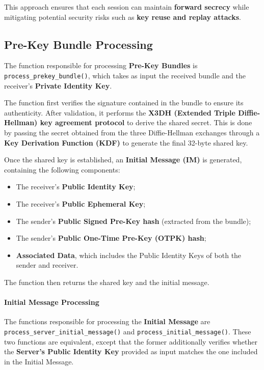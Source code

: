 \noindent This approach ensures that each session can maintain \textbf{forward secrecy} while mitigating potential security risks such as \textbf{key reuse and replay attacks}.

\subsection{Pre-Key Bundle Processing}
\label{subsec:Pre-KeyBundleProcessing}

The function responsible for processing \textbf{Pre-Key Bundles} is \texttt{process\_prekey\_bundle()}, which takes as input the received bundle and the receiver's \textbf{Private Identity Key}.

\noindent The function first verifies the signature contained in the bundle to ensure its authenticity. After validation, it performs the \textbf{X3DH (Extended Triple Diffie-Hellman) key agreement protocol} to derive the shared secret. This is done by passing the secret obtained from the three Diffie-Hellman exchanges through a \textbf{Key Derivation Function (KDF)} to generate the final 32-byte shared key.  

\noindent Once the shared key is established, an \textbf{Initial Message (IM)} is generated, containing the following components:  

\begin{itemize}  
    \item The receiver's \textbf{Public Identity Key};  
    \item The receiver's \textbf{Public Ephemeral Key};  
    \item The sender's \textbf{Public Signed Pre-Key hash} (extracted from the bundle);  
    \item The sender's \textbf{Public One-Time Pre-Key (OTPK) hash};  
    \item \textbf{Associated Data}, which includes the Public Identity Keys of both the sender and receiver.  
\end{itemize}  

\noindent The function then returns the shared key and the initial message.

\paragraph{Initial Message Processing}  
\sloppy  
The functions responsible for processing the \textbf{Initial Message} are \texttt{process\_server\_initial\_message()} and \texttt{process\_initial\_message()}. These two functions are equivalent, except that the former additionally verifies whether the \textbf{Server's Public Identity Key} provided as input matches the one included in the Initial Message.  


